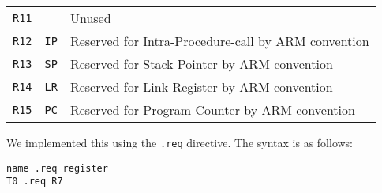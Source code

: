 \begin{table}[h!]
\begin{tabular}{l | l | l}
        \texttt{R11}    & ~                 & Unused                                                 \\
        \texttt{R12}    & \texttt{IP}       & Reserved for Intra-Procedure-call by ARM convention    \\
        \texttt{R13}    & \texttt{SP}       & Reserved for Stack Pointer by ARM convention           \\
        \texttt{R14}    & \texttt{LR}       & Reserved for Link Register  by ARM convention          \\
        \texttt{R15}    & \texttt{PC}       & Reserved for Program Counter by ARM convention         \\
    \end{tabular}
\end{table}

We implemented this using the \texttt{.req} directive. The syntax is as follows:

\begin{lstlisting}[label=register-aliasing,caption=Register aliasing]
name .req register
T0 .req R7
\end{lstlisting}

